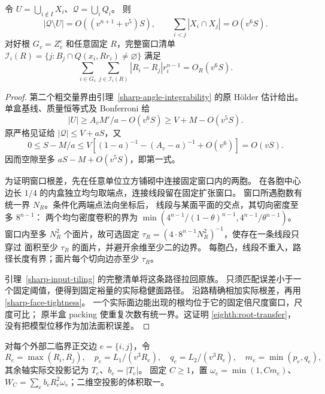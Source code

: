 \begin{lemma}[实际空隙及窗口根差]\label{eighth:window}
令 \(U=\bigcup_{i\notin I}X_i\)、\(\mathcal Q=\bigcup_iQ_i\)。
则
\begin{equation}\label{eighth:void}
 |\mathcal Q\setminus U|=O((v^{n+1}+v^5)S),\qquad
 \sum_{i<j}|X_i\cap X_j|=O(v^6S).
\end{equation}
对好根 \(G_v=Z_v^c\) 和任意固定 \(R\)，完整窗口清单
\(\mathcal I_i(R)=\{j:B_j\cap Q(x_i,Rr_i)\ne\varnothing\}\) 满足
\begin{equation}\label{eighth:root-transfer}
 \sum_{i\in G_v}\sum_{j\in\mathcal I_i(R)}
       |R_i-R_j|r_i^{n-1}=O_R(v^6S).
\end{equation}
\end{lemma}
\begin{proof}
第二个粗交量界由引理~\ref{sharp-angle-integrability} 的原 Hölder 估计给出。
单盒基线、质量恒等式及 Bonferroni 给
\[
 |U|\ge A_vM'/a-O(v^6S)\ge V+M-O(v^5S).
\]
原严格见证给 \(|\mathcal Q|\le V+aS\)，又
\[
 0\le S-M/a\le
 V\left[(1-a)^{-1}-(A_v-a)^{-1}+O(v^6)\right]=O(vS).
\]
因而空隙至多 \(aS-M+O(v^5S)\)，即第一式。

为证明窗口根差，先在任意单位立方铺砌中连接固定窗口内的两胞。
在各胞中心边长 \(1/4\) 的内盒独立均匀取端点，连接线段留在固定扩张窗口。
窗口所遇胞数有统一界 \(N_R\)。条件化两端点法向坐标后，
线段与某面平面的交点，其切向密度至多 \(8^{n-1}\)：
两个均匀密度卷积的界为
\(\min(4^{n-1}/(1-\theta)^{n-1},4^{n-1}/\theta^{n-1})\)。
窗口内至多 \(N_R^2\) 个面片，故可选固定
\(\tau_R=(4\cdot8^{n-1}N_R^2)^{-1}\)，使存在一条线段只穿过
面积至少 \(\tau_R\) 的面片，并避开余维至少二的边界。
每胞凸，线段不重入，路径长度有界；面片每个切向边亦至少 \(\tau_R\)。

引理~\ref{sharp-input-tiling} 的完整清单将这条路径拉回原族。
只须匹配误差小于一个固定阈值，便得到固定裕量的实际稳健面路径。
沿路精确相加实际根差，再用 \eqref{sharp-face-tightness}。
一个实际面边能出现的根均位于它的固定倍尺度窗口，尺度可比；
原半盒 packing 使重复次数有统一界。这证明 \eqref{eighth:root-transfer}，
没有把模型位移作为加法面积误差。
\end{proof}

对每个外部二临界正交边 \(e=\{i,j\}\)，令
\[
 R_e=\max(R_i,R_j),\quad
 p_e=L_1/(v^3R_e),\quad q_e=L_2/(v^3R_e),\quad m_e=\min(p_e,q_e),
\]
其余轴实际交投影记为 \(T_e\)、\(b_e=|T_e|\)。
固定 \(C\ge1\)，置 \(\omega_e=\min(1,Cm_e)\)、
\(W_C=\sum_e b_eR_e^2\omega_e\)；二维空投影的体积取一。


